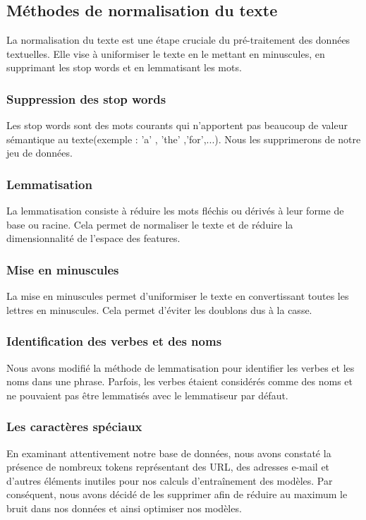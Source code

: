 \subsection{Méthodes de normalisation du texte}
La normalisation du texte est une étape cruciale du pré-traitement des données textuelles. Elle vise à uniformiser le texte en le mettant en minuscules, en supprimant les stop words et en lemmatisant les mots.

\subsubsection*{Suppression des stop words}

Les stop words sont des mots courants qui n'apportent pas beaucoup de valeur sémantique au texte(exemple : 'a' , 'the' ,'for',...). Nous les supprimerons de notre jeu de données.

\subsubsection*{Lemmatisation}

La lemmatisation consiste à réduire les mots fléchis ou dérivés à leur forme de base ou racine. Cela permet de normaliser le texte et de réduire la dimensionnalité de l'espace des features.

\subsubsection*{Mise en minuscules}

La mise en minuscules permet d'uniformiser le texte en convertissant toutes les lettres en minuscules. Cela permet d'éviter les doublons dus à la casse.

\subsubsection*{Identification des verbes et des noms}

Nous avons modifié la méthode de lemmatisation pour identifier les verbes et les noms dans une phrase. Parfois, les verbes étaient considérés comme des noms et ne pouvaient pas être lemmatisés avec le lemmatiseur par défaut.

\subsubsection*{Les caractères spéciaux}

En examinant attentivement notre base de données, nous avons constaté la présence de nombreux tokens représentant des URL, des adresses e-mail et d’autres éléments inutiles pour nos calculs d’entraînement des modèles. 
Par conséquent, nous avons décidé de les supprimer afin de réduire au maximum le bruit dans nos données et ainsi optimiser nos modèles.

